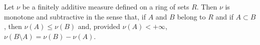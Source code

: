 Let $\nu$ be a finitely additive measure defined on a ring of sets $R$. Then $\nu$ is monotone and subtractive in the sense that, if $A$ and $B$ belong to $R$ and if $A \subset B$, then $\nu(A) \leq \nu(B)$ and, provided $\nu(A) < +\infty$, $\nu(B \setminus A) = \nu(B) - \nu(A)$.
